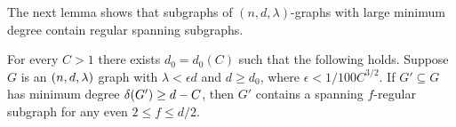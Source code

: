 \documentclass[11pt]{article}
\begin{document}


The next lemma shows that subgraphs of $(n, d, \lambda)$-graphs with large minimum degree contain regular spanning subgraphs.

\begin{lemma}\label{lemma:f-factor}
  For every $C > 1$ there exists $d_0 = d_0(C)$ such that the following holds.
Suppose $G$ is an $(n, d, \lambda)$ graph with $\lambda < \epsilon d$ and $d \ge d_0$, where $\epsilon < 1/100C^{3/2}$.
If $G' \subseteq G$ has minimum degree $\delta({G'}) \ge d - C$, then $G'$ contains a spanning $f$-regular subgraph for any even $2 \le f \le d/2$. 
\end{lemma}
\end{document}
